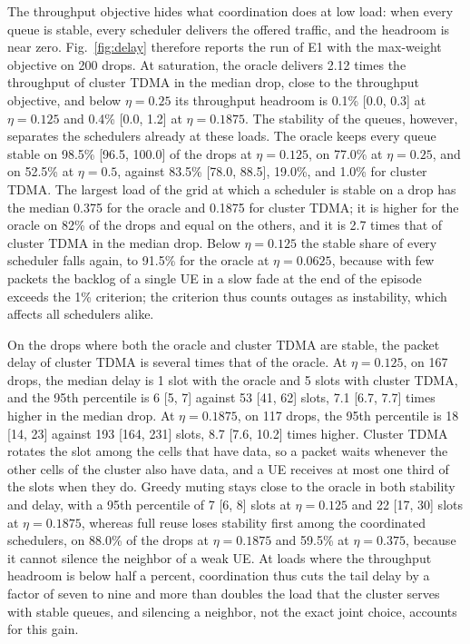 \documentclass{ieeeaccess}
\begin{document}
The throughput objective hides what coordination does at low load: when every queue is stable, every scheduler delivers the offered traffic, and the headroom is near zero. Fig.~\ref{fig:delay} therefore reports the run of E1 with the max-weight objective on 200 drops. At saturation, the oracle delivers 2.12 times the throughput of cluster TDMA in the median drop, close to the throughput objective, and below $\eta = 0.25$ its throughput headroom is 0.1\% [0.0, 0.3] at $\eta = 0.125$ and 0.4\% [0.0, 1.2] at $\eta = 0.1875$. The stability of the queues, however, separates the schedulers already at these loads. The oracle keeps every queue stable on 98.5\% [96.5, 100.0] of the drops at $\eta = 0.125$, on 77.0\% at $\eta = 0.25$, and on 52.5\% at $\eta = 0.5$, against 83.5\% [78.0, 88.5], 19.0\%, and 1.0\% for cluster TDMA. The largest load of the grid at which a scheduler is stable on a drop has the median 0.375 for the oracle and 0.1875 for cluster TDMA; it is higher for the oracle on 82\% of the drops and equal on the others, and it is 2.7 times that of cluster TDMA in the median drop. Below $\eta = 0.125$ the stable share of every scheduler falls again, to 91.5\% for the oracle at $\eta = 0.0625$, because with few packets the backlog of a single UE in a slow fade at the end of the episode exceeds the 1\% criterion; the criterion thus counts outages as instability, which affects all schedulers alike.

On the drops where both the oracle and cluster TDMA are stable, the packet delay of cluster TDMA is several times that of the oracle. At $\eta = 0.125$, on 167 drops, the median delay is 1 slot with the oracle and 5 slots with cluster TDMA, and the 95th percentile is 6 [5, 7] against 53 [41, 62] slots, 7.1 [6.7, 7.7] times higher in the median drop. At $\eta = 0.1875$, on 117 drops, the 95th percentile is 18 [14, 23] against 193 [164, 231] slots, 8.7 [7.6, 10.2] times higher. Cluster TDMA rotates the slot among the cells that have data, so a packet waits whenever the other cells of the cluster also have data, and a UE receives at most one third of the slots when they do. Greedy muting stays close to the oracle in both stability and delay, with a 95th percentile of 7 [6, 8] slots at $\eta = 0.125$ and 22 [17, 30] slots at $\eta = 0.1875$, whereas full reuse loses stability first among the coordinated schedulers, on 88.0\% of the drops at $\eta = 0.1875$ and 59.5\% at $\eta = 0.375$, because it cannot silence the neighbor of a weak UE. At loads where the throughput headroom is below half a percent, coordination thus cuts the tail delay by a factor of seven to nine and more than doubles the load that the cluster serves with stable queues, and silencing a neighbor, not the exact joint choice, accounts for this gain.
\end{document}
